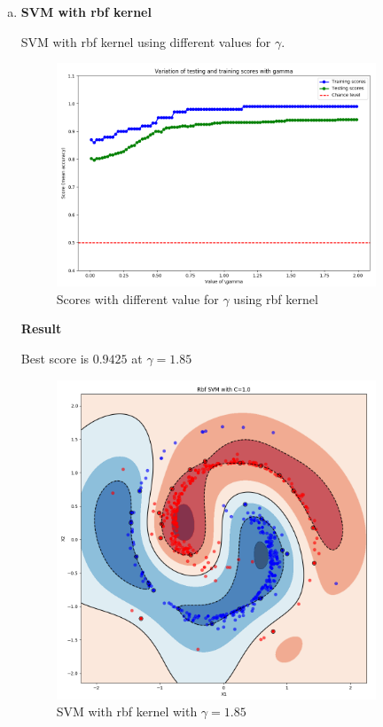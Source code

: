 \documentclass[12pt,a4paper]{article}
\begin{document}
\begin{enumerate}[a)]
\newpage
  \item \textbf{SVM with rbf kernel}

SVM with rbf kernel using different values for $\gamma$.

\begin{figure}[H]
	\centering
  \includegraphics[width=0.9\textwidth]{figures/svm2_c_scores.png}
	\caption{Scores with different value for $\gamma$ using rbf kernel}
	\label{svm2_c_scores}
\end{figure}

\textbf{Result}

Best score is $0.9425$ at $\gamma = 1.85$

\begin{figure}[H]
	\centering
  \includegraphics[width=0.9\textwidth]{figures/svm2_c_best.png}
	\caption{SVM with rbf kernel with $\gamma = 1.85$}
	\label{svm2_c_best}
\end{figure}


\end{enumerate}
\end{document}
